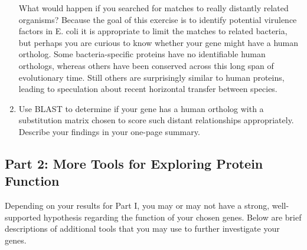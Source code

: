 \begin{enumerate}
What would happen if you searched for matches to really distantly related organisms?  Because the goal of this exercise is to identify potential virulence factors in E. coli it is appropriate to limit the matches to related bacteria, but perhaps you are curious to know whether your gene might have a human ortholog. Some bacteria-specific proteins have no identifiable human orthologs, whereas others have been conserved across this long span of evolutionary time.  Still others are surprisingly similar to human proteins, leading to speculation about recent horizontal transfer between species.  

	\item Use BLAST to determine if your gene has a human ortholog with a substitution matrix chosen to score such distant relationships appropriately.  Describe your findings in your one-page summary.

\end{enumerate}

\vspace*{-.1in}
\subsection*{Part 2: More Tools for Exploring Protein Function}
\vspace*{-.1in} 

Depending on your results for Part I, you may or may not have a strong, well-supported hypothesis regarding the function of your chosen genes.  Below are brief descriptions of additional tools that you may use to further investigate your genes.\\

